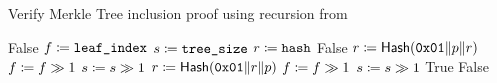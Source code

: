 \begin{algorithm}[p]
\caption{Verify Merkle Tree inclusion proof using \gls{recursion}
    from~\cite{rfc9162}}
\label{alg:merkle_proof_verify_ctv}
\begin{algorithmic}[1]
        \State \Return \textsf{False}
    \EndIf
    \State $f \coloneqq{} \texttt{leaf\_index}$
    \State $s \coloneqq{} \texttt{tree\_size}$
    \State $r \coloneqq{} \texttt{hash}$
            \State \Return \textsf{False}
        \EndIf
            \State $r \coloneqq{} \textsf{Hash}(\texttt{0x01} \| p \| r)$
                \State $f \coloneqq{} f \gg 1$
                \State $s \coloneqq{} s \gg 1$
            \EndWhile
        \Else
            \State $r \coloneqq{} \textsf{Hash}(\texttt{0x01} \| r \| p)$
        \EndIf
        \State $f \coloneqq{} f \gg 1$
        \State $s \coloneqq{} s \gg 1$
    \EndFor
        \State \Return \textsf{True}
    \Else
        \State \Return \textsf{False}
    \EndIf
\EndProcedure
\end{algorithmic}
\end{algorithm}
